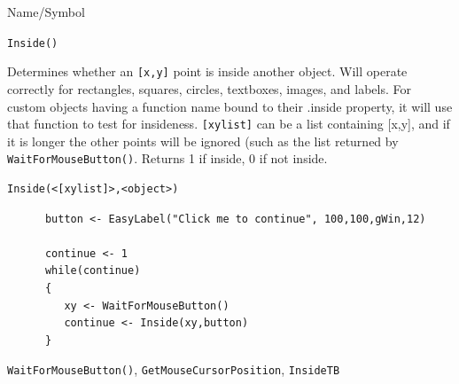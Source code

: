 \begin{desc}{Name/Symbol}
\item[Name/Symbol]	\verb+Inside()+

\item[Description] Determines whether an \verb+[x,y]+ point is inside another
  object.  Will operate correctly for rectangles, squares, circles,
  textboxes, images, and labels. For custom objects having a function name bound to their .inside property, it will use that function to test for insideness. \verb+[xylist]+ can be a list containing
  [x,y], and if it is longer the other points will be ignored (such as
  the list returned by \verb+WaitForMouseButton()+.  Returns 1 if inside, 0
  if not inside.

\item[Usage]
\begin{verbatim}
Inside(<[xylist]>,<object>)	
\end{verbatim}

\item[Example]	

\begin{verbatim}
      button <- EasyLabel("Click me to continue", 100,100,gWin,12)

      continue <- 1
      while(continue)
      {
         xy <- WaitForMouseButton()
         continue <- Inside(xy,button)
      }
\end{verbatim}

\item[See Also]	
\verb+WaitForMouseButton()+, \verb+GetMouseCursorPosition+, \verb+InsideTB+

\end{desc}




